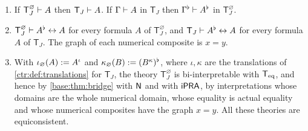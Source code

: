 \begin{theorem}\label{ctr:thm:cfbridge}
\leavevmode
\begin{enumerate}
\item If $\mathsf T_J^{\varnothing}\vdash A$ then $\mathsf T_J\vdash A$. If
$\Gamma\vdash A$ in $\mathsf T_J$ then $\Gamma^\flat\vdash A^\flat$ in
$\mathsf T_J^{\varnothing}$.
\item $\mathsf T_J^{\varnothing}\vdash A^\flat\leftrightarrow A$ for every formula $A$ of
$\mathsf T_J^{\varnothing}$, and $\mathsf T_J\vdash A^\flat\leftrightarrow A$ for every
formula $A$ of $\mathsf T_J$. The graph of each numerical composite is $x=y$.
\item With $\iota_\varnothing(A)\mathrel{:=} A^\iota$ and
$\kappa_\varnothing(B)\mathrel{:=}(B^\kappa)^\flat$, where $\iota,\kappa$ are the translations of
\cref{ctr:def:translations} for $\mathsf T_J$, the theory $\mathsf T_J^{\varnothing}$ is
bi-interpretable with $\mathsf{T}_{\mathrm{eq}}$, and hence by \cref{base:thm:bridge} with $\mathsf{N}$ and with
$\mathsf{iPRA}$, by interpretations whose domains are the whole numerical domain, whose equality is
actual equality and whose numerical composites have the graph $x=y$. All these theories are
equiconsistent.
\end{enumerate}
\end{theorem}
